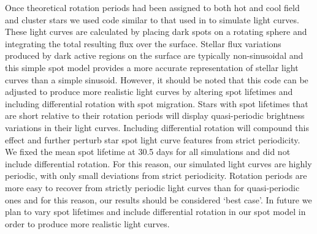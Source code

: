 Once theoretical rotation periods had been assigned to both hot and cool field
and cluster stars we used code similar to that used in \citet{Aigrain2015b} to
simulate light curves.
These light curves are calculated by placing dark spots on a rotating sphere
and integrating the total resulting flux over the surface.
Stellar flux variations produced by dark active regions on the surface are
typically non-sinusoidal and this simple spot model provides a more accurate
representation of stellar light curves than a simple sinusoid.
However, it should be noted that this code can be adjusted to produce more
realistic light curves by altering spot lifetimes and including differential
rotation with spot migration.
Stars with spot lifetimes that are short relative to their rotation periods
will display quasi-periodic brightness variations in their light curves.
Including differential rotation will compound this effect and further perturb
star spot light curve features from strict periodicity.
We fixed the mean spot lifetime at 30.5 days for all simulations and did not
include differential rotation.
For this reason, our simulated light curves are highly periodic, with only
small deviations from strict periodicity.
Rotation periods are more easy to recover from strictly periodic light curves
than for quasi-periodic ones and for this reason, our results should be
considered `best case'.
In future we plan to vary spot lifetimes and include differential rotation in
our spot model in order to produce more realistic light curves.

